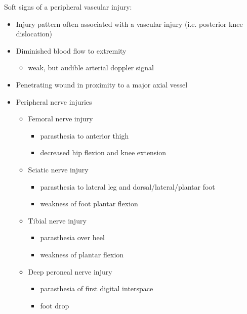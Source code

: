 \documentclass[
]{book}
\providecommand{\tightlist}{%
  \setlength{\itemsep}{0pt}\setlength{\parskip}{0pt}}
\begin{document}
Soft signs of a peripheral vascular injury:

\begin{itemize}
\item
  Injury pattern often associated with a vascular injury (i.e.
  posterior knee dislocation)
\item
  Diminished blood flow to extremity

  \begin{itemize}
  \tightlist
  \item
    weak, but audible arterial doppler signal
  \end{itemize}
\item
  Penetrating wound in proximity to a major axial vessel
\item
  Peripheral nerve injuries

  \begin{itemize}
  \tightlist
  \item
    Femoral nerve injury

    \begin{itemize}
    \tightlist
    \item
      parasthesia to anterior thigh
    \item
      decreased hip flexion and knee extension
    \end{itemize}
  \item
    Sciatic nerve injury

    \begin{itemize}
    \tightlist
    \item
      parasthesia to lateral leg and dorsal/lateral/plantar foot
    \item
      weakness of foot plantar flexion
    \end{itemize}
  \item
    Tibial nerve injury

    \begin{itemize}
    \tightlist
    \item
      parasthesia over heel
    \item
      weakness of plantar flexion
    \end{itemize}
  \item
    Deep peroneal nerve injury

    \begin{itemize}
    \tightlist
    \item
      parasthesia of first digital interspace
    \item
      foot drop\citep{bulger2014}
    \end{itemize}
  \end{itemize}
\end{itemize}
\end{document}
